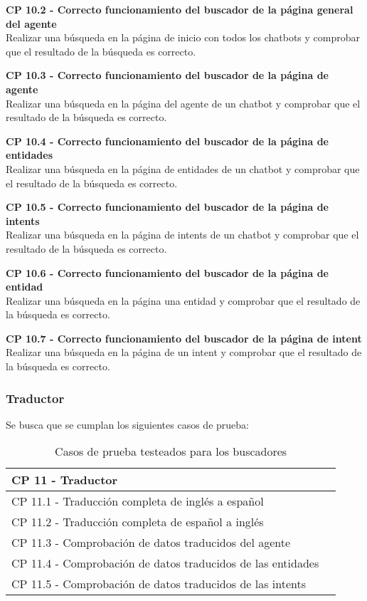\textbf{CP 10.2 - Correcto funcionamiento del buscador de la página general del agente} \\
Realizar una búsqueda en la página de inicio con todos los chatbots y comprobar que el resultado de la búsqueda es correcto.

\textbf{CP 10.3 - Correcto funcionamiento del buscador de la página de agente} \\
Realizar una búsqueda en la página del agente de un chatbot y comprobar que el resultado de la búsqueda es correcto.

\textbf{CP 10.4 - Correcto funcionamiento del buscador de la página de entidades} \\
Realizar una búsqueda en la página de entidades de un chatbot y comprobar que el resultado de la búsqueda es correcto.

\textbf{CP 10.5 - Correcto funcionamiento del buscador de la página de intents} \\
Realizar una búsqueda en la página de intents de un chatbot y comprobar que el resultado de la búsqueda es correcto.

\textbf{CP 10.6 - Correcto funcionamiento del buscador de la página de entidad} \\
Realizar una búsqueda en la página una entidad y comprobar que el resultado de la búsqueda es correcto.

\textbf{CP 10.7 - Correcto funcionamiento del buscador de la página de intent} \\
Realizar una búsqueda en la página de un intent y comprobar que el resultado de la búsqueda es correcto.


\subsubsection{Traductor}
Se busca que se cumplan los siguientes casos de prueba:

\begin{table}[H]
\centering
\begin{tabular}{ll}
\toprule
CP 11 - Traductor   \\
\midrule
CP 11.1 - Traducción completa de inglés a español  \\
CP 11.2 - Traducción completa de español a inglés \\
CP 11.3 - Comprobación de datos traducidos del agente \\
CP 11.4 - Comprobación de datos traducidos de las entidades \\
CP 11.5 - Comprobación de datos traducidos de las intents \\
\bottomrule
\end{tabular}
\caption{Casos de prueba testeados para los buscadores}
\end{table}

